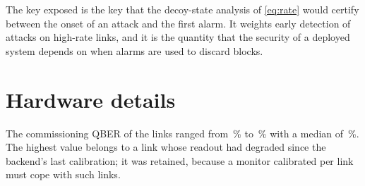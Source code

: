 The key exposed is the key that the decoy-state analysis of \cref{eq:rate} would certify between the onset of an attack and the first alarm. It weights early detection of attacks on high-rate links, and it is the quantity that the security of a deployed system depends on when alarms are used to discard blocks.

\section{Hardware details}\label{app:hardware}

\begin{table}[h]
\centering
\caption{Calibration of the \HwLinks{} links on \HwBackend{} at the time of the run (backend-reported values).}
\label{tab:hwcal}
\small

\end{table}

The commissioning QBER of the links ranged from \HwQberCalMin\,\% to \HwQberCalMax\,\% with a median of \HwQberCalMed\,\%. The highest value belongs to a link whose readout had degraded since the backend's last calibration; it was retained, because a monitor calibrated per link must cope with such links.

\begin{table}[h]
\centering
\caption{Pre-registered analysis (reference: commissioning passes). Fraction of link-epochs flagged at $\alpha=10^{-3}$. Every test flags most honest link-epochs; see \cref{sec:hw-pre}.}
\label{tab:hwpre}
\small

\end{table}

\begin{table}[h]
\centering
\caption{Condition-matched reference: shots per circuit at which half of the attacked link-epochs are flagged at $\alpha=10^{-3}$ (left; 50 is the smallest value tested), and information gathered by Eve before that point, in bits of sifted key (right).}
\label{tab:hwleak}
\small

\end{table}

\begin{table}[h]
\centering
\caption{Eve's information measured on her ancilla. $I_{\rm match}$: mutual information per sifted round in which her probe basis matched Alice's basis (Miller--Madow corrected \cite{Miller1955}); $P_{\rm guess\,err}$: her guessing error on those rounds; $I_{\rm sift}$: information per sifted round averaged over all sifted rounds.}
\label{tab:hwinfo}
\small

\end{table}

